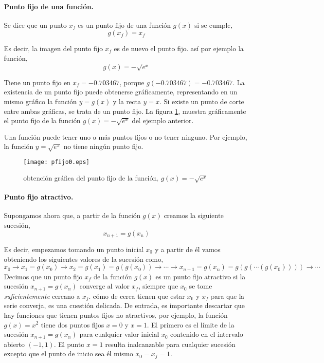 \paragraph{Punto fijo de una función.} Se dice que un punto $x_f$ es un punto fijo de una función $g(x)$ si se cumple,
\begin{equation*}
g(x_f)=x_f
\end{equation*}

Es decir, la imagen del punto fijo $x_f$ es de nuevo el punto fijo. así por ejemplo la función,
\begin{equation*}
g(x)=-\sqrt{e^x}
\end{equation*}

Tiene un punto fijo en $x_f=-0.703467$, porque $g(-0.703467)=-0.703467$. La existencia de un punto fijo puede obtenerse gráficamente, representando en un mismo gráfico la función $y=g(x)$ y la recta $y=x$. Si existe un punto de corte entre ambas gráficas, se trata de un punto fijo.  La figura \ref{fig:pfijo0}, muestra gráficamente el punto fijo de la función $g(x)=-\sqrt{e^x}$ del ejemplo anterior.

Una función puede tener uno o más puntos fijos o no tener ninguno. Por ejemplo, la función $y=\sqrt{e^x}$ no tiene ningún punto fijo.


\begin{figure}[h]
\texttt{[image: pfijo0.eps]}
\caption{obtención gráfica del punto fijo de la función, $g(x)=-\sqrt{e^x}$}
\label{fig:pfijo0}
\end{figure}

\paragraph{Punto fijo atractivo.} Supongamos ahora que, a partir de la función $g(x)$ creamos la siguiente sucesión,
\begin{equation*}
x_{n+1}=g(x_n)
\end{equation*}

Es decir, empezamos tomando un punto inicial $x_0$ y a partir de él vamos obteniendo los siguientes valores de la sucesión como,
\begin{equation*}
x_0\rightarrow x_1=g(x_0)\rightarrow x_2=g(x_1)=g\left(g(x_0)\right) \rightarrow \cdots \rightarrow x_{n+1}=g(x_{n})=g\left( g\left( \cdots\left( g(x_0)\right)\right)\right) \rightarrow \cdots
\end{equation*}
Decimos que un punto fijo $x_f$ de la función $g(x)$ es un punto fijo atractivo si la sucesión $x_{n+1}=g(x_n)$ converge al valor $x_f$, siempre que $x_0$ se tome \emph{suficientemente} cercano a $x_f$. cómo de cerca tienen que estar $x_0$ y $x_f$ para que la serie converja, es una cuestión delicada. De entrada, es importante descartar que hay funciones que tienen puntos fijos no atractivos, por ejemplo, la función $g(x)=x^2$ tiene dos puntos fijos $x=0$ y $x=1$. El primero es el límite de la sucesión $x_{n+1}=g(x_n)$ para cualquier valor inicial $x_0$ contenido en el intervalo abierto $(-1,  1)$. El punto $x=1$ resulta inalcanzable para cualquier sucesión excepto que el punto de inicio sea él mismo $x_0=x_f=1$.

